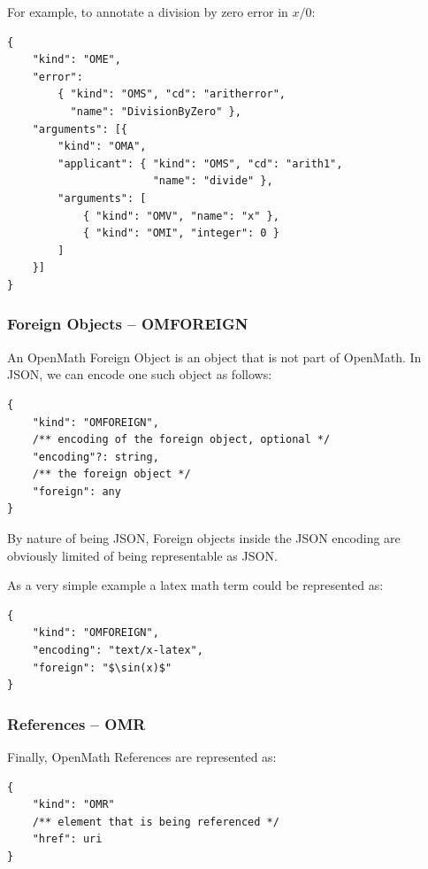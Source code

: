 For example, to annotate a division by zero error in $x/0$:
\\\begin{minipage}{\linewidth}\begin{lstlisting}
{
    "kind": "OME",
    "error":
        { "kind": "OMS", "cd": "aritherror", 
          "name": "DivisionByZero" },
    "arguments": [{
        "kind": "OMA",
        "applicant": { "kind": "OMS", "cd": "arith1",
                       "name": "divide" },
        "arguments": [
            { "kind": "OMV", "name": "x" },
            { "kind": "OMI", "integer": 0 }
        ]
    }]
}
\end{lstlisting}\end{minipage}

\subsubsection{Foreign Objects -- OMFOREIGN}

An OpenMath Foreign Object is an object that is not part of OpenMath. 
In JSON, we can encode one such object as follows:
\\\begin{minipage}{\linewidth}\begin{lstlisting}
{
    "kind": "OMFOREIGN",
    /** encoding of the foreign object, optional */
    "encoding"?: string,
    /** the foreign object */
    "foreign": any
}
\end{lstlisting}\end{minipage}

By nature of being JSON, Foreign objects inside the JSON encoding are obviously limited of being representable as JSON. 

As a very simple example a latex math term could be represented as:
\\\begin{minipage}{\linewidth}\begin{lstlisting}
{
    "kind": "OMFOREIGN",
    "encoding": "text/x-latex",
    "foreign": "$\sin(x)$"
}
\end{lstlisting}\end{minipage}

\subsubsection{References -- OMR}

Finally, OpenMath References are represented as:
\\\begin{minipage}{\linewidth}\begin{lstlisting}
{
    "kind": "OMR"
    /** element that is being referenced */
    "href": uri
}
\end{lstlisting}\end{minipage}


